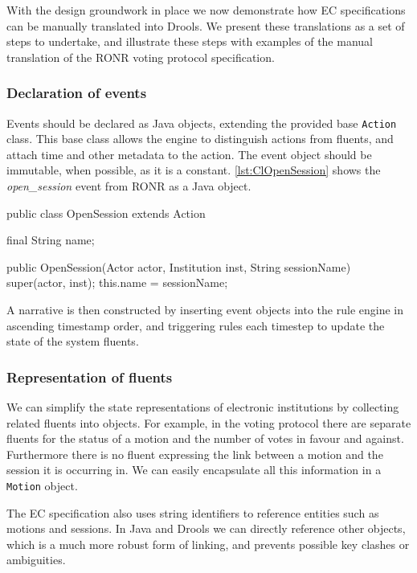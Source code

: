 With the design groundwork in place we now demonstrate how \ac{EC}
specifications can be manually translated into Drools. We present these translations as a
set of steps to undertake, and illustrate these steps with examples of the manual
translation of the \ac{RONR} voting protocol specification.

\subsubsection*{Declaration of events}

Events should be declared as Java objects, extending the provided base
\texttt{Action} class. This base class allows the engine to distinguish
actions from fluents, and attach time and other metadata to the action. The
event object should be immutable, when possible, as it is a constant. \autoref{lst:ClOpenSession}
shows the \emph{open\_session} event from \ac{RONR} as a Java object.

\begin{java}[label=lst:ClOpenSession,caption=OpenSession action as a Java object]
public class OpenSession extends Action {

	final String name;
	
	public OpenSession(Actor actor, Institution inst, String sessionName) {
		super(actor, inst);
		this.name = sessionName;
	}
}
\end{java}

A narrative is then constructed by inserting event objects into the rule engine in ascending timestamp order, and triggering rules each timestep to update the state of the system fluents.

\subsubsection*{Representation of fluents}

We can simplify the state representations of electronic institutions by collecting
related fluents into objects. For example, in the voting protocol there are separate
fluents for the status of a motion and the number of votes in favour and against.
Furthermore there is no fluent expressing the link between a motion and the
session it is occurring in. We can easily encapsulate all this information in a
\texttt{Motion} object. 

The \ac{EC} specification also uses string identifiers to reference entities
such as motions and sessions. In Java and Drools we can directly reference other
objects, which is a much more robust form of linking, and prevents possible key
clashes or ambiguities.

